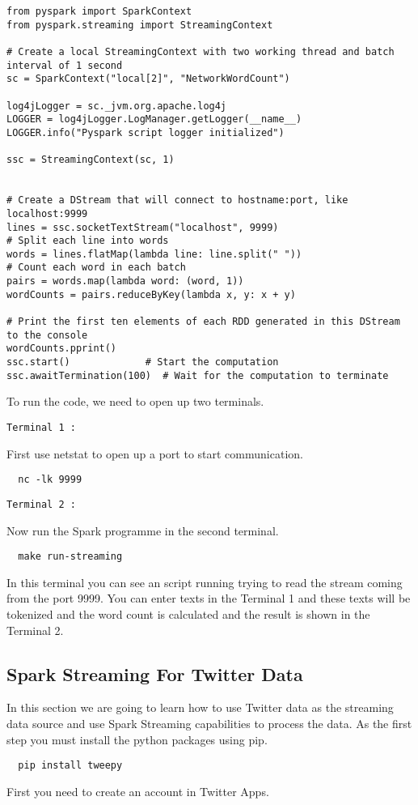 \begin{lstlisting}
from pyspark import SparkContext
from pyspark.streaming import StreamingContext

# Create a local StreamingContext with two working thread and batch interval of 1 second
sc = SparkContext("local[2]", "NetworkWordCount")

log4jLogger = sc._jvm.org.apache.log4j
LOGGER = log4jLogger.LogManager.getLogger(__name__)
LOGGER.info("Pyspark script logger initialized")

ssc = StreamingContext(sc, 1)


# Create a DStream that will connect to hostname:port, like localhost:9999
lines = ssc.socketTextStream("localhost", 9999)
# Split each line into words
words = lines.flatMap(lambda line: line.split(" "))
# Count each word in each batch
pairs = words.map(lambda word: (word, 1))
wordCounts = pairs.reduceByKey(lambda x, y: x + y)

# Print the first ten elements of each RDD generated in this DStream to the console
wordCounts.pprint()
ssc.start()             # Start the computation
ssc.awaitTermination(100)  # Wait for the computation to terminate

\end{lstlisting}

To run the code, we need to open up two terminals.

\verb|Terminal 1 :|

First use netstat to open up a port to start communication.

\begin{lstlisting}
  nc -lk 9999
\end{lstlisting}


\verb|Terminal 2 :|

Now run the Spark programme in the second terminal.

\begin{lstlisting}
  make run-streaming
\end{lstlisting}

In this terminal you can see an script running trying to read
the stream coming from the port 9999. You can enter texts in the
Terminal 1 and these texts will be tokenized and the word count is
calculated and the result is shown in the Terminal 2.

\subsection{Spark Streaming For Twitter Data}

In this section we are going to learn how to use Twitter data as the streaming data source and use Spark Streaming capabilities to process the data. As the first step you must install the python packages using pip.

\begin{lstlisting}
  pip install tweepy
\end{lstlisting}

First you need to create an account in Twitter Apps. 